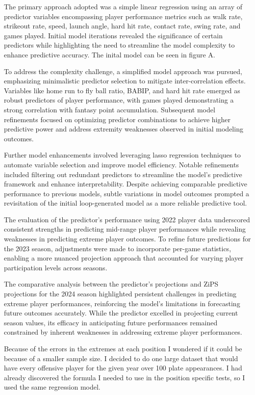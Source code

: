 \documentclass[12pt, english]{article}
\begin{document}
The primary approach adopted was a simple linear regression using an array of predictor variables encompassing player performance metrics such as walk rate, strikeout rate, speed, launch angle, hard hit rate, contact rate, swing rate, and games played. Initial model iterations revealed the significance of certain predictors while highlighting the need to streamline the model complexity to enhance predictive accuracy. The inital model can be seen in figure A.

To address the complexity challenge, a simplified model approach was pursued, emphasizing minimalistic predictor selection to mitigate inter-correlation effects. Variables like home run to fly ball ratio, BABIP, and hard hit rate emerged as robust predictors of player performance, with games played demonstrating a strong correlation with fantasy point accumulation. Subsequent model refinements focused on optimizing predictor combinations to achieve higher predictive power and address extremity weaknesses observed in initial modeling outcomes.

Further model enhancements involved leveraging lasso regression techniques to automate variable selection and improve model efficiency. Notable refinements included filtering out redundant predictors to streamline the model's predictive framework and enhance interpretability. Despite achieving comparable predictive performance to previous models, subtle variations in model outcomes prompted a revisitation of the initial loop-generated model as a more reliable predictive tool.

The evaluation of the predictor's performance using 2022 player data underscored consistent strengths in predicting mid-range player performances while revealing weaknesses in predicting extreme player outcomes. To refine future predictions for the 2023 season, adjustments were made to incorporate per-game statistics, enabling a more nuanced projection approach that accounted for varying player participation levels across seasons.

The comparative analysis between the predictor's projections and ZiPS projections for the 2024 season highlighted persistent challenges in predicting extreme player performances, reinforcing the model's limitations in forecasting future outcomes accurately. While the predictor excelled in projecting current season values, its efficacy in anticipating future performances remained constrained by inherent weaknesses in addressing extreme player performances.

Because of the errors in the extremes at each position I wondered if it could be because of a smaller sample size. I decided to do one large dataset that would have every offensive player for the given year over 100 plate appearances. I had already discovered the formula I needed to use in the position specific tests, so I used the same regression model. 
\end{document}
